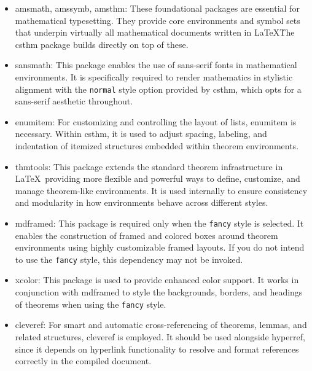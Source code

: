 \documentclass[10pt,letterpaper]{amsart}
\begin{document}
\begin{itemize}[label={--}]
	\item \textsf{amsmath}, \textsf{amssymb}, \textsf{amsthm}: These foundational packages are essential for mathematical typesetting. They provide core environments and symbol sets that underpin virtually all mathematical documents written in \LaTeX\. The \textsf{csthm} package builds directly on top of these.

	\item \textsf{sansmath}: This package enables the use of sans-serif fonts in mathematical environments. It is specifically required to render mathematics in stylistic alignment with the \texttt{normal} style option provided by \textsf{csthm}, which opts for a sans-serif aesthetic throughout.

	\item \textsf{enumitem}: For customizing and controlling the layout of lists, \textsf{enumitem} is necessary. Within \textsf{csthm}, it is used to adjust spacing, labeling, and indentation of itemized structures embedded within theorem environments.

	\item \textsf{thmtools}: This package extends the standard theorem infrastructure in \LaTeX\, providing more flexible and powerful ways to define, customize, and manage theorem-like environments. It is used internally to ensure consistency and modularity in how environments behave across different styles.

	\item \textsf{mdframed}: This package is required only when the \texttt{fancy} style is selected. It enables the construction of framed and colored boxes around theorem environments using highly customizable framed layouts. If you do not intend to use the \texttt{fancy} style, this dependency may not be invoked.

	\item \textsf{xcolor}: This package is used to provide enhanced color support. It works in conjunction with \textsf{mdframed} to style the backgrounds, borders, and headings of theorems when using the \texttt{fancy} style.

	\item \textsf{cleveref}: For smart and automatic cross-referencing of theorems, lemmas, and related structures, \textsf{cleveref} is employed. It should be used alongside \textsf{hyperref}, since it depends on hyperlink functionality to resolve and format references correctly in the compiled document.

\end{itemize}
\end{document}
